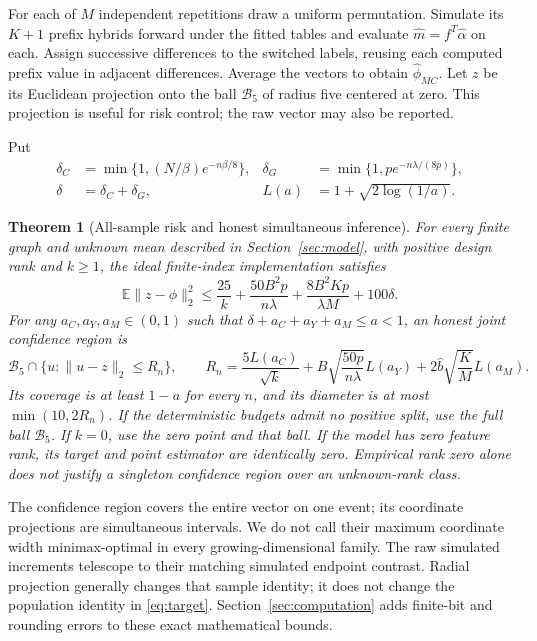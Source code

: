 \documentclass[11pt,a4paper]{article}
\numberwithin{equation}{section}
\newtheorem{theorem}{Theorem}[section]
\theoremstyle{definition}
\newcommand{\E}{\mathbb E}
\begin{document}
For each of $M$ independent repetitions draw a uniform permutation.
Simulate its $K+1$ prefix hybrids forward under the fitted tables and
evaluate $\widehat m=f^T\widehat\alpha$ on each. Assign successive
differences to the switched labels, reusing each computed prefix value
in adjacent differences. Average the vectors to obtain $\widehat\phi_{MC}$.
Let $z$ be its Euclidean projection onto the ball $\mathcal B_5$ of radius
five centered at zero. This projection is useful for risk control; the
raw vector may also be reported.

Put
\begin{equation}\label{eq:failures}
 \begin{aligned}
 \delta_C&=\min\{1,(N/\beta)e^{-n\beta/8}\},&
 \delta_G&=\min\{1,p e^{-n\lambda/(8p)}\},\\
 \delta&=\delta_C+\delta_G,&
 L(a)&=1+\sqrt{2\log(1/a)}.
 \end{aligned}
\end{equation}

\begin{theorem}[All-sample risk and honest simultaneous inference]\label{thm:main}
For every finite graph and unknown mean described in Section~\ref{sec:model},
with positive design rank and $k\ge1$, the ideal finite-index implementation
satisfies
\begin{equation}\label{eq:risk}
 \E\|z-\phi\|_2^2\le
 \frac{25}{k}+\frac{50B^2p}{n\lambda}
       +\frac{8B^2Kp}{\lambda M}+100\delta.
\end{equation}
For any $a_C,a_Y,a_M\in(0,1)$ such that
$\delta+a_C+a_Y+a_M\le a<1$, an honest joint confidence region is
\begin{equation}\label{eq:confidence}
 \mathcal B_5\cap\{u:\|u-z\|_2\le R_n\},\qquad
 R_n=\frac{5L(a_C)}{\sqrt k}
       +B\sqrt{\frac{50p}{n\lambda}}L(a_Y)
       +2\widehat b\sqrt{\frac K M}L(a_M).
\end{equation}
Its coverage is at least $1-a$ for every $n$, and its diameter is at most
$\min(10,2R_n)$. If the deterministic budgets admit no positive split,
use the full ball $\mathcal B_5$. If $k=0$, use the zero point and that
ball. If the model has zero feature rank, its target and point estimator
are identically zero. Empirical rank zero alone does not justify a
singleton confidence region over an unknown-rank class.
\end{theorem}

The confidence region covers the entire vector on one event; its
coordinate projections are simultaneous intervals. We do not call their
maximum coordinate width minimax-optimal in every growing-dimensional
family. The raw simulated increments telescope to their matching
simulated endpoint contrast. Radial projection generally changes that
sample identity; it does not change the population identity in
\eqref{eq:target}. Section~\ref{sec:computation} adds finite-bit and
rounding errors to these exact mathematical bounds.
\end{document}
